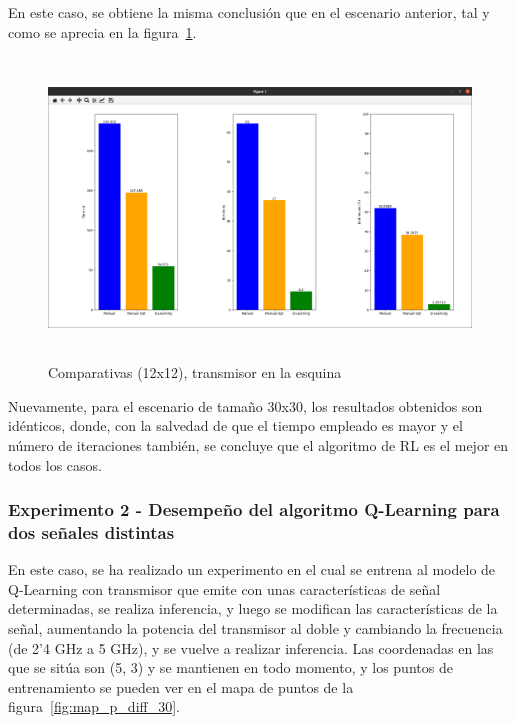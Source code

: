 En este caso, se obtiene la misma conclusión que en el escenario anterior, tal y como se aprecia en la figura~\ref{fig:comp_esq_12}.\\

\begin{figure} [t]
    \begin{center}
    \includegraphics[height=8cm]{imagenes/cap4/20_comp_esq_12.png}
    \end{center}
    \caption[Comparativas (12x12), transmisor en la esquina]{Comparativas (12x12), transmisor en la esquina}
    \label{fig:comp_esq_12}
\end{figure}

Nuevamente, para el escenario de tamaño 30x30, los resultados obtenidos son idénticos, donde, con la salvedad de que el tiempo empleado es mayor y el número de iteraciones también, se concluye que el algoritmo de \ac{RL} es el mejor en todos los casos.\\

\subsubsection{Experimento 2 - Desempeño del algoritmo Q-Learning para dos señales distintas}
\label{subsubsec:experimentos_1}

En este caso, se ha realizado un experimento en el cual se entrena al modelo de Q-Learning con transmisor que emite con unas características de señal determinadas, se realiza inferencia, y luego se modifican las características de la señal, aumentando la potencia del transmisor al doble y cambiando la frecuencia (de 2'4 GHz a 5 GHz), y se vuelve a realizar inferencia. Las coordenadas en las que se sitúa son (5, 3) y se mantienen en todo momento, y los puntos de entrenamiento se pueden ver en el mapa de puntos de la figura~\ref{fig:map_p_diff_30}.\\

